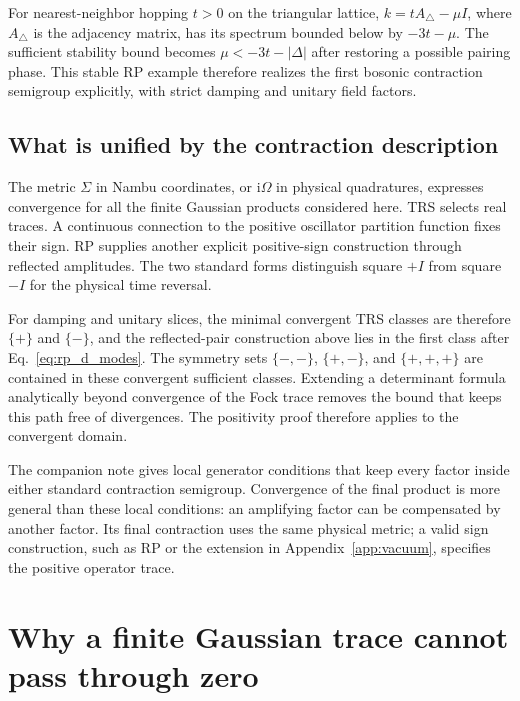 \documentclass[11pt,a4paper]{article}
\newcommand{\ii}{\mathrm i}
\numberwithin{equation}{section}
\begin{document}
For nearest-neighbor hopping $t>0$ on the triangular lattice,
$k=tA_\triangle-\mu I$, where $A_\triangle$ is the adjacency matrix,
has its spectrum bounded below by $-3t-\mu$.
The sufficient stability bound becomes
$\mu<-3t-|\Delta|$ after restoring a possible pairing phase.
This stable RP example therefore realizes the first bosonic contraction
semigroup explicitly, with strict damping and unitary field
factors.

\subsection{What is unified by the contraction description}

The metric $\Sigma$ in Nambu coordinates, or $\ii\Omega$ in physical
quadratures, expresses convergence for all the finite Gaussian products
considered here. TRS selects real traces. A continuous connection
to the positive oscillator partition function fixes their sign.
RP supplies another
explicit positive-sign construction through reflected amplitudes.
The two standard forms distinguish square $+I$ from square $-I$ for
the physical time reversal.

For damping and unitary slices, the minimal convergent TRS classes are
therefore $\{+\}$ and $\{-\}$, and the reflected-pair construction
above lies in the first class after Eq.~\eqref{eq:rp_d_modes}.
The symmetry sets $\{-,-\}$, $\{+,-\}$, and $\{+,+,+\}$ are
contained in these convergent sufficient classes. Extending a
determinant formula analytically beyond convergence of the Fock trace
removes the bound that keeps this path free of divergences.
The positivity proof therefore applies to the convergent domain.

The companion note gives local generator conditions that keep every
factor inside either standard contraction semigroup. Convergence of
the final product is more general than these local conditions:
an amplifying factor can be compensated by another factor.
Its final contraction uses the same physical metric; a valid sign
construction, such as RP or the extension in Appendix~\ref{app:vacuum},
specifies the positive operator trace.

\appendix
\section{Why a finite Gaussian trace cannot pass through zero}
\label{app:gaussian_trace}
\end{document}
